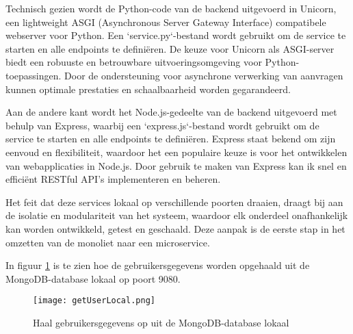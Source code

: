 Technisch gezien wordt de Python-code van de backend uitgevoerd in Unicorn, een lightweight ASGI (Asynchronous Server Gateway Interface) compatibele webserver voor Python. Een `service.py`-bestand wordt gebruikt om de service te starten en alle endpoints te definiëren. De keuze voor Unicorn als ASGI-server biedt een robuuste en betrouwbare uitvoeringsomgeving voor Python-toepassingen. Door de ondersteuning voor asynchrone verwerking van aanvragen kunnen optimale prestaties en schaalbaarheid worden gegarandeerd.

Aan de andere kant wordt het Node.js-gedeelte van de backend uitgevoerd met behulp van Express, waarbij een `express.js`-bestand wordt gebruikt om de service te starten en alle endpoints te definiëren. Express staat bekend om zijn eenvoud en flexibiliteit, waardoor het een populaire keuze is voor het ontwikkelen van webapplicaties in Node.js. Door gebruik te maken van Express kan ik snel en efficiënt RESTful API's implementeren en beheren.

Het feit dat deze services lokaal op verschillende poorten draaien, draagt bij aan de isolatie en modulariteit van het systeem, waardoor elk onderdeel onafhankelijk kan worden ontwikkeld, getest en geschaald. Deze aanpak is de eerste stap in het omzetten van de monoliet naar een microservice.

In figuur \ref{fig:getUserLocal} is te zien hoe de gebruikersgegevens worden opgehaald uit de MongoDB-database lokaal op poort 9080.

\begin{figure}
	\centering	
	\texttt{[image: getUserLocal.png]} 
	\caption{Haal gebruikersgegevens op uit de MongoDB-database lokaal}
	\label{fig:getUserLocal} 
\end{figure}
\FloatBarrier